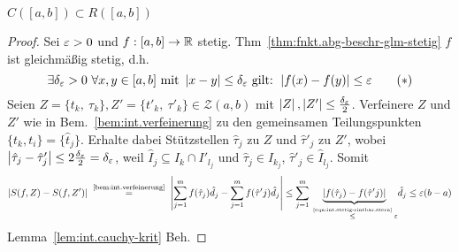 \documentclass[12pt]{scrreprt}
\begin{document}

\begin{satz}
  \label{satz:int.stetig-rintbar}
  $C([a,b]) \subset R([a,b])$
\end{satz}
\begin{proof}
  Sei $\varepsilon>0$ und $f:[a,b]\rightarrow\mathbb{R}$
  stetig. Thm~\ref{thm:fnkt.abg-beschr-glm-stetig} \folgt $f$ ist
  gleichmäßig stetig, d.h.
  \begin{equation*}
    \label{eqn:int.stetig-rintbar.stern}
    \exists \delta_\varepsilon>0\ \forall x,y\in[a,b] \text{ mit }
    \left\lvert x-y\right\lvert\le\delta_\varepsilon \text{ gilt: } \left\lvert f(x)-f(y)\right\lvert\le\varepsilon
    \tag{$*$}
  \end{equation*}
  Seien $Z=\{t_k,\ \tau_k\},Z'=\{t'_k,\ \tau'_k\}\in\mathcal{Z}(a,b)$ mit
  $\left\lvert Z\right\lvert,\left\lvert Z'\right\lvert\le\frac{\delta_\varepsilon}{2}$. Verfeinere $Z$ und $Z'$
  wie in Bem.~\ref{bem:int.verfeinerung} zu den gemeinsamen
  Teilungspunkten $\{t_k,t_i\}=\{\hat{t}_j\}$. Erhalte dabei
  Stützstellen $\hat{\tau}_j$ zu $Z$ und $\hat{\tau}'_j$ zu $Z'$,
  wobei
  $\left\lvert\hat{\tau}_j-\hat{\tau}'_j\right\lvert\le2\frac{\delta_\varepsilon}{2}=\delta_\varepsilon$,
  weil $\hat{I}_j\subseteq I_k\cap I'_{l_j}$ und $\hat{\tau}_j\in
  I_{k_j}$, $\hat{\tau}'_j\in\hat{I}_{l_j}$. Somit
  \[\abs{S(f,Z)-S(f,Z')} \nach{=}{\ref{bem:int.verfeinerung}}
  \abs{\sum_{j=1}^m{f(\hat{\tau}_j)\hat{d}_j} -
    \sum_{j=1}^m{f(\hat{\tau}'j)\hat{d}_j}} \le
  \sum_{j=1}^m{\underbrace{\abs{f(\hat{\tau}_j)-f(\hat{\tau}'j)}}_{\nach{\le}{\ref{eqn:int.stetig-rintbar.stern}}\ep}}\hat{d}_j \le
  \ep(b-a)\]
  Lemma~\ref{lem:int.cauchy-krit} \folgt Beh.
\end{proof}
\end{document}
